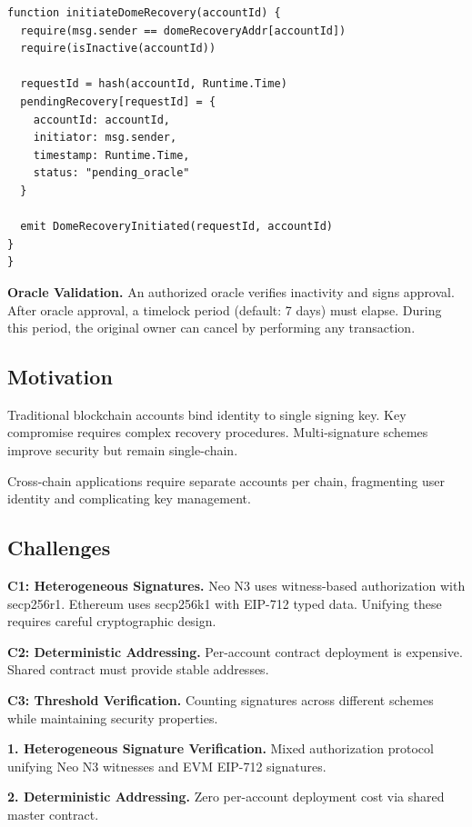 \documentclass[10pt,twocolumn]{article}
\begin{document}
{
\small
\begin{verbatim}
function initiateDomeRecovery(accountId) {
  require(msg.sender == domeRecoveryAddr[accountId])
  require(isInactive(accountId))
  
  requestId = hash(accountId, Runtime.Time)
  pendingRecovery[requestId] = {
    accountId: accountId,
    initiator: msg.sender,
    timestamp: Runtime.Time,
    status: "pending_oracle"
  }
  
  emit DomeRecoveryInitiated(requestId, accountId)
}
}
\end{verbatim}

\textbf{Oracle Validation.} An authorized oracle verifies inactivity and signs approval. After oracle approval, a timelock period (default: 7 days) must elapse. During this period, the original owner can cancel by performing any transaction.


\subsection{Motivation}

Traditional blockchain accounts bind identity to single signing key. Key compromise requires complex recovery procedures. Multi-signature schemes improve security but remain single-chain.

Cross-chain applications require separate accounts per chain, fragmenting user identity and complicating key management.

\subsection{Challenges}

\textbf{C1: Heterogeneous Signatures.} Neo N3 uses witness-based authorization with secp256r1. Ethereum uses secp256k1 with EIP-712 typed data. Unifying these requires careful cryptographic design.

\textbf{C2: Deterministic Addressing.} Per-account contract deployment is expensive. Shared contract must provide stable addresses.

\textbf{C3: Threshold Verification.} Counting signatures across different schemes while maintaining security properties.

\textbf{1. Heterogeneous Signature Verification.} Mixed authorization protocol unifying Neo N3 witnesses and EVM EIP-712 signatures.

\textbf{2. Deterministic Addressing.} Zero per-account deployment cost via shared master contract.

}
\end{document}
